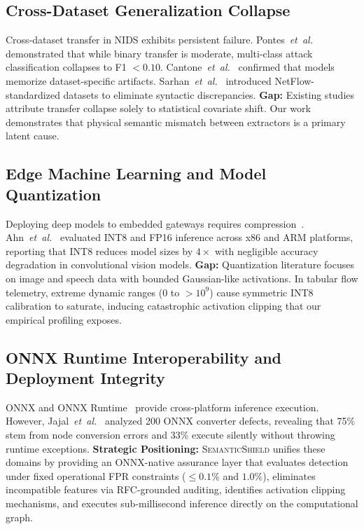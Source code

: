 \documentclass[journal]{IEEEtran}
\newcommand{\etal}{\emph{et~al.}}
\newcommand{\sysname}{\textsc{SemanticShield}}
\begin{document}
\subsection{Cross-Dataset Generalization Collapse}
Cross-dataset transfer in NIDS exhibits persistent failure. Pontes~\etal~\cite{pontes2021crossdataset} demonstrated that while binary transfer is moderate, multi-class attack classification collapses to F1 $< 0.10$. Cantone~\etal~\cite{cantone2024crossdataset} confirmed that models memorize dataset-specific artifacts. Sarhan~\etal~\cite{sarhan2022nftoniot} introduced NetFlow-standardized datasets to eliminate syntactic discrepancies.
\textbf{Gap:} Existing studies attribute transfer collapse solely to statistical covariate shift. Our work demonstrates that physical semantic mismatch between extractors is a primary latent cause.

\subsection{Edge Machine Learning and Model Quantization}
Deploying deep models to embedded gateways requires compression~\cite{liang2024quantsurvey,nagel2021whitepaper,lin2024edgeml,chaturvedi2025edgemlops}. Ahn~\etal~\cite{quantedge2023} evaluated INT8 and FP16 inference across x86 and ARM platforms, reporting that INT8 reduces model sizes by $4\times$ with negligible accuracy degradation in convolutional vision models.
\textbf{Gap:} Quantization literature focuses on image and speech data with bounded Gaussian-like activations. In tabular flow telemetry, extreme dynamic ranges ($0$ to $>10^9$) cause symmetric INT8 calibration to saturate, inducing catastrophic activation clipping that our empirical profiling exposes.

\subsection{ONNX Runtime Interoperability and Deployment Integrity}
ONNX and ONNX Runtime~\cite{onnxruntime2024} provide cross-platform inference execution. However, Jajal~\etal~\cite{jajal2024onnxfailures} analyzed 200 ONNX converter defects, revealing that 75\% stem from node conversion errors and 33\% execute silently without throwing runtime exceptions.
\textbf{Strategic Positioning:} \sysname{} unifies these domains by providing an ONNX-native assurance layer that evaluates detection under fixed operational FPR constraints ($\le 0.1\%$ and $1.0\%$), eliminates incompatible features via RFC-grounded auditing, identifies activation clipping mechanisms, and executes sub-millisecond inference directly on the computational graph.
\end{document}
